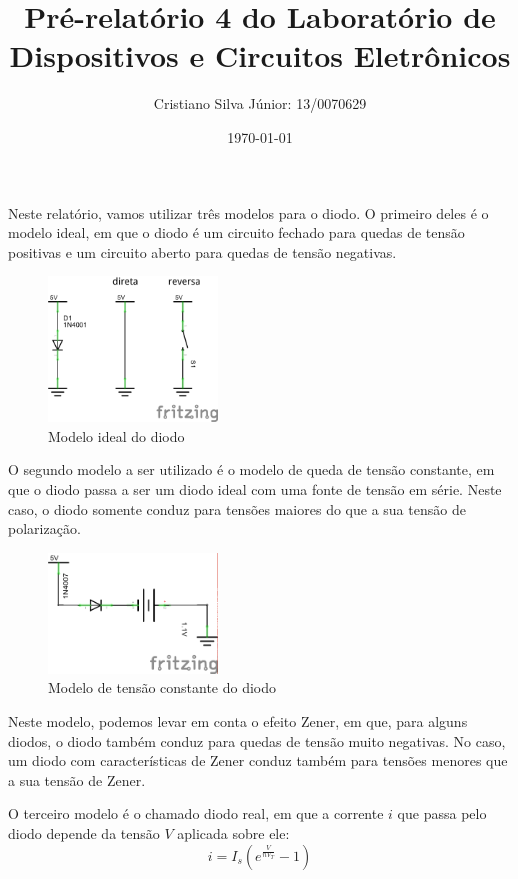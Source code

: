 \documentclass[12pt, a4paper, twoside]{article}
\begin{document}
\title{Pré-relatório 4 do Laboratório de Dispositivos e Circuitos Eletrônicos}
\author{Cristiano Silva Júnior: 13/0070629}
\date{\today}
\maketitle

Neste relatório, vamos utilizar três modelos para o diodo. O primeiro deles é o modelo ideal, em que o diodo é um circuito fechado para quedas de tensão positivas e um circuito aberto para quedas de tensão negativas.

\begin{figure}[H]
    \centering
    \includegraphics[width=0.4\textwidth]{figs/diode.png}
    \caption{Modelo ideal do diodo}
\end{figure}

O segundo modelo a ser utilizado é o modelo de queda de tensão constante, em que o diodo passa a ser um diodo ideal com uma fonte de tensão em série. Neste caso, o diodo somente conduz para tensões maiores do que a sua tensão de polarização.

\begin{figure}[H]
    \centering
    \includegraphics[width=0.4\textwidth]{figs/diode2.png}
    \caption{Modelo de tensão constante do diodo}
\end{figure}

Neste modelo, podemos levar em conta o efeito Zener, em que, para alguns diodos, o diodo também conduz para quedas de tensão muito negativas. No caso, um diodo com características de Zener conduz também para tensões menores que a sua tensão de Zener.

O terceiro modelo é o chamado diodo real, em que a corrente $i$ que passa pelo diodo depende da tensão $V$ aplicada sobre ele:
$$i = I_s\left( e^{\frac{V}{nV_T}} - 1 \right)$$
\end{document}
